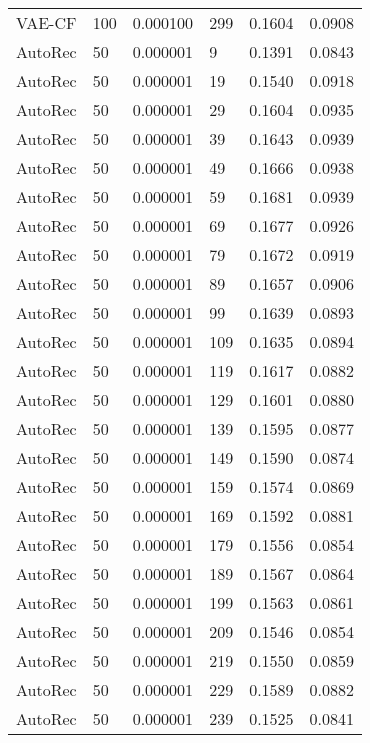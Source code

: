 \begin{tabular}{llrlrr}
  VAE-CF &  100 &  0.000100 &   299 &  0.1604 &       0.0908 \\
 AutoRec &   50 &  0.000001 &     9 &  0.1391 &       0.0843 \\
 AutoRec &   50 &  0.000001 &    19 &  0.1540 &       0.0918 \\
 AutoRec &   50 &  0.000001 &    29 &  0.1604 &       0.0935 \\
 AutoRec &   50 &  0.000001 &    39 &  0.1643 &       0.0939 \\
 AutoRec &   50 &  0.000001 &    49 &  0.1666 &       0.0938 \\
 AutoRec &   50 &  0.000001 &    59 &  0.1681 &       0.0939 \\
 AutoRec &   50 &  0.000001 &    69 &  0.1677 &       0.0926 \\
 AutoRec &   50 &  0.000001 &    79 &  0.1672 &       0.0919 \\
 AutoRec &   50 &  0.000001 &    89 &  0.1657 &       0.0906 \\
 AutoRec &   50 &  0.000001 &    99 &  0.1639 &       0.0893 \\
 AutoRec &   50 &  0.000001 &   109 &  0.1635 &       0.0894 \\
 AutoRec &   50 &  0.000001 &   119 &  0.1617 &       0.0882 \\
 AutoRec &   50 &  0.000001 &   129 &  0.1601 &       0.0880 \\
 AutoRec &   50 &  0.000001 &   139 &  0.1595 &       0.0877 \\
 AutoRec &   50 &  0.000001 &   149 &  0.1590 &       0.0874 \\
 AutoRec &   50 &  0.000001 &   159 &  0.1574 &       0.0869 \\
 AutoRec &   50 &  0.000001 &   169 &  0.1592 &       0.0881 \\
 AutoRec &   50 &  0.000001 &   179 &  0.1556 &       0.0854 \\
 AutoRec &   50 &  0.000001 &   189 &  0.1567 &       0.0864 \\
 AutoRec &   50 &  0.000001 &   199 &  0.1563 &       0.0861 \\
 AutoRec &   50 &  0.000001 &   209 &  0.1546 &       0.0854 \\
 AutoRec &   50 &  0.000001 &   219 &  0.1550 &       0.0859 \\
 AutoRec &   50 &  0.000001 &   229 &  0.1589 &       0.0882 \\
 AutoRec &   50 &  0.000001 &   239 &  0.1525 &       0.0841 \\

\end{tabular}
